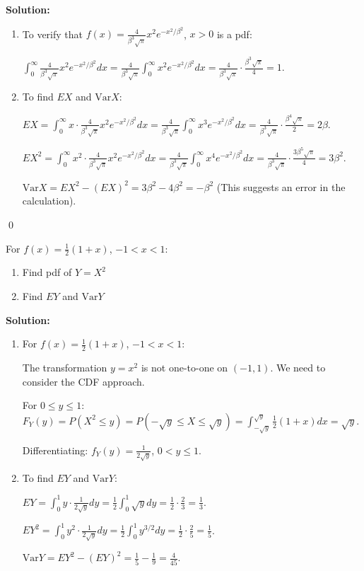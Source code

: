 \noindent\textbf{Solution:}
\begin{enumerate}[label=(\alph*)]
    \item To verify that $f(x)=\frac{4}{\beta^3\sqrt{\pi}}x^2e^{-x^2/\beta^2}$, $x>0$ is a pdf:
    
    $\int_0^\infty \frac{4}{\beta^3\sqrt{\pi}}x^2e^{-x^2/\beta^2}dx = \frac{4}{\beta^3\sqrt{\pi}} \int_0^\infty x^2e^{-x^2/\beta^2}dx = \frac{4}{\beta^3\sqrt{\pi}} \cdot \frac{\beta^3\sqrt{\pi}}{4} = 1$.
    
    \item To find $EX$ and $\text{Var}X$:
    
    $EX = \int_0^\infty x \cdot \frac{4}{\beta^3\sqrt{\pi}}x^2e^{-x^2/\beta^2}dx = \frac{4}{\beta^3\sqrt{\pi}} \int_0^\infty x^3e^{-x^2/\beta^2}dx = \frac{4}{\beta^3\sqrt{\pi}} \cdot \frac{\beta^4\sqrt{\pi}}{2} = 2\beta$.
    
    $EX^2 = \int_0^\infty x^2 \cdot \frac{4}{\beta^3\sqrt{\pi}}x^2e^{-x^2/\beta^2}dx = \frac{4}{\beta^3\sqrt{\pi}} \int_0^\infty x^4e^{-x^2/\beta^2}dx = \frac{4}{\beta^3\sqrt{\pi}} \cdot \frac{3\beta^5\sqrt{\pi}}{4} = 3\beta^2$.
    
    $\text{Var}X = EX^2 - (EX)^2 = 3\beta^2 - 4\beta^2 = -\beta^2$ (This suggests an error in the calculation).
\end{enumerate}


\qed
\begin{problembox}
For $f(x)=\frac{1}{2}(1+x)$, $-1<x<1$:
\begin{enumerate}[label=(\alph*)]
    \item Find pdf of $Y=X^2$
    \item Find $EY$ and $\text{Var}Y$
\end{enumerate}
\end{problembox}

\noindent\textbf{Solution:}
\begin{enumerate}[label=(\alph*)]
    \item For $f(x)=\frac{1}{2}(1+x)$, $-1<x<1$:
    
    The transformation $y = x^2$ is not one-to-one on $(-1,1)$. We need to consider the CDF approach.
    
    For $0 \leq y \leq 1$: $F_Y(y) = P(X^2 \leq y) = P(-\sqrt{y} \leq X \leq \sqrt{y}) = \int_{-\sqrt{y}}^{\sqrt{y}} \frac{1}{2}(1+x)dx = \sqrt{y}$.
    
    Differentiating: $f_Y(y) = \frac{1}{2\sqrt{y}}$, $0 < y \leq 1$.
    
    \item To find $EY$ and $\text{Var}Y$:
    
    $EY = \int_0^1 y \cdot \frac{1}{2\sqrt{y}}dy = \frac{1}{2}\int_0^1 \sqrt{y}dy = \frac{1}{2} \cdot \frac{2}{3} = \frac{1}{3}$.
    
    $EY^2 = \int_0^1 y^2 \cdot \frac{1}{2\sqrt{y}}dy = \frac{1}{2}\int_0^1 y^{3/2}dy = \frac{1}{2} \cdot \frac{2}{5} = \frac{1}{5}$.
    
    $\text{Var}Y = EY^2 - (EY)^2 = \frac{1}{5} - \frac{1}{9} = \frac{4}{45}$.
\end{enumerate}


